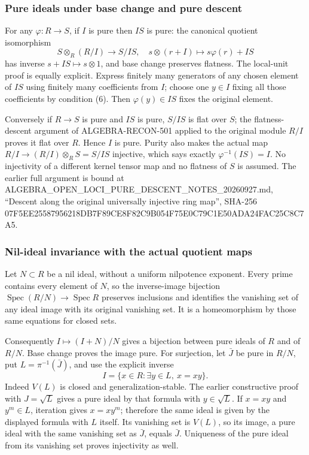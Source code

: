 \subsubsection{Pure ideals under base change and pure descent}\label{algebra-proof-022-pure-ideals-under-base-change-and-pure-descent}

For any \(\varphi:R\to S\), if \(I\) is pure then \(IS\) is pure: the canonical quotient isomorphism \[
S\otimes_R(R/I)\longrightarrow S/IS,\quad
s\otimes(r+I)\longmapsto s\varphi(r)+IS
\] has inverse \(s+IS\mapsto s\otimes1\), and base change preserves flatness. The local-unit proof is equally explicit. Express finitely many generators of any chosen element of \(IS\) using finitely many coefficients from \(I\); choose one \(y\in I\) fixing all those coefficients by condition (6). Then \(\varphi(y)\in IS\) fixes the original element.

Conversely if \(R\to S\) is pure and \(IS\) is pure, \(S/IS\) is flat over \(S\); the flatness-descent argument of ALGEBRA-RECON-501 applied to the original module \(R/I\) proves it flat over \(R\). Hence \(I\) is pure. Purity also makes the actual map \(R/I\to (R/I)\otimes_RS=S/IS\) injective, which says exactly \(\varphi^{-1}(IS)=I\). No injectivity of a different kernel tensor map and no flatness of \(S\) is assumed. The earlier full argument is bound at ALGEBRA\_OPEN\_LOCI\_PURE\_DESCENT\_NOTES\_20260927.md, ``Descent along the original universally injective ring map'', SHA-256 07F5EE25587956218DB7F89CE8F82C9B054F75E0C79C1E50ADA24FAC25C8C7A5.

\subsubsection{Nil-ideal invariance with the actual quotient maps}\label{algebra-proof-022-nil-ideal-invariance-with-the-actual-quotient-maps}

Let \(N\subset R\) be a nil ideal, without a uniform nilpotence exponent. Every prime contains every element of \(N\), so the inverse-image bijection \(\operatorname{Spec}(R/N)\to\operatorname{Spec}R\) preserves inclusions and identifies the vanishing set of any ideal image with its original vanishing set. It is a homeomorphism by those same equations for closed sets.

Consequently \(I\mapsto(I+N)/N\) gives a bijection between pure ideals of \(R\) and of \(R/N\). Base change proves the image pure. For surjection, let \(\bar J\) be pure in \(R/N\), put \(L=\pi^{-1}(\bar J)\), and use the explicit inverse \[
I=\{x\in R:\exists y\in L,\ x=xy\}.
\] Indeed \(V(L)\) is closed and generalization-stable. The earlier constructive proof with \(J=\sqrt L\) gives a pure ideal by that formula with \(y\in\sqrt L\). If \(x=xy\) and \(y^m\in L\), iteration gives \(x=xy^m\); therefore the same ideal is given by the displayed formula with \(L\) itself. Its vanishing set is \(V(L)\), so its image, a pure ideal with the same vanishing set as \(\bar J\), equals \(\bar J\). Uniqueness of the pure ideal from its vanishing set proves injectivity as well.

